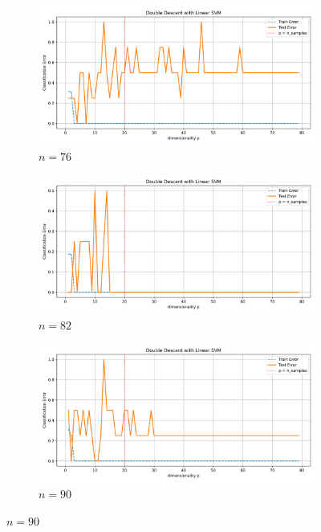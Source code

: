 \documentclass{article}
\begin{document}
\begin{figure}[htb]
  \begin{subfigure}[b]{\imgwidth}
    \includegraphics[width=\linewidth]{img_qq/risk_curve_n40.png}
    \caption{$n=76$}\label{fig:2e1}
  \end{subfigure}%
  \hfill
  \begin{subfigure}[b]{\imgwidth}
    \includegraphics[width=\linewidth]{img_qq/risk_curve_n50.png}
    \caption{$n=82$}\label{fig:2f1}
  \end{subfigure}%
  \hfill
  \begin{subfigure}[b]{\imgwidth}
    \includegraphics[width=\linewidth]{img_qq/risk_curve_n60.png}
    \caption{$n=90$}\label{fig:2g1}

\end{subfigure}
\end{figure}
\end{document}
